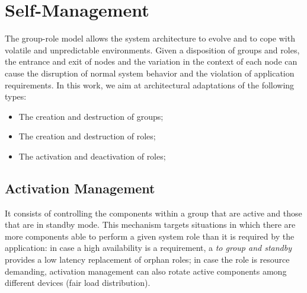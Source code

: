 \section{Self-Management}\label{sec:group_mangement}



The group-role model allows the system architecture to evolve and to cope with volatile and unpredictable environments. Given a disposition of groups and roles, the entrance and exit of nodes and the variation in the context of each node can cause the disruption of normal system behavior and the violation of application requirements. In this work, we aim at architectural adaptations of the following types:

\begin{itemize}
	\item The creation and destruction of groups;
	
	\item The creation and destruction of roles;
	
	\item The activation and deactivation of roles;
\end{itemize}





\subsection{Activation Management}

It consists of controlling the components within a group that are active and those that are in standby mode. This mechanism targets situations in which there are more components able to perform a given system role than it is required by the application: in case a high availability is a requirement, a \textit{to group and standby} provides a low latency replacement of orphan roles; in case the role is resource demanding, activation management can also rotate active components among different devices (fair load distribution). 



